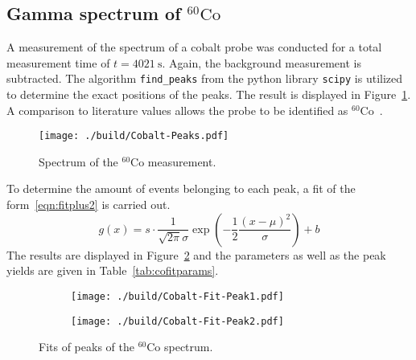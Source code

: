 \subsection{Gamma spectrum of \texorpdfstring{$^{60}\mathrm{Co}$}{cobalt}}
A measurement of the spectrum of a cobalt probe was conducted for a total measurement time of
$t=\SI{4021}{\second}$. Again, the background measurement is subtracted. The algorithm \texttt{find\_peaks}
from the python library \texttt{scipy} \cite{scipy}
is utilized to determine the exact positions of the peaks. The result is displayed in
Figure~\ref{fig:cospectrum}. A comparison to literature values allows the probe to be identified as
$^{60}\text{Co}$~\cite{laraweb}.
\begin{figure}
	\centering
	\begin{adjustbox}{width=1.4\textwidth, center}
		\texttt{[image: ./build/Cobalt-Peaks.pdf]}
	\end{adjustbox}
	\caption{Spectrum of the $^{60}\text{Co}$ measurement.}
	\label{fig:cospectrum}
\end{figure}
\noindent
To determine the amount of events belonging to each peak, a fit of the form~\eqref{eqn:fitplus2} is carried out.
\begin{equation}
	g(x) = s \cdot \frac{1}{\sqrt{2 \pi} \sigma} \exp{\left( -\frac{1}{2} \frac{(x - \mu)^{2}}{\sigma} \right)} + b
	\label{eqn:fitplus2}
\end{equation}
\noindent
The results are displayed in Figure~\ref{fig:cofit} and the parameters as well as the peak yields are given in
Table~\ref{tab:cofitparams}.
\begin{figure}[H]
	\centering
	\begin{adjustbox}{width=1.3\textwidth, center}
		\begin{subfigure}{.5\textwidth}
			\centering
			\texttt{[image: ./build/Cobalt-Fit-Peak1.pdf]}
		\end{subfigure}%
		\begin{subfigure}{.5\textwidth}
			\centering
			\texttt{[image: ./build/Cobalt-Fit-Peak2.pdf]}
		\end{subfigure}
	\end{adjustbox}
	\caption{Fits of peaks of the $^{60}\text{Co}$ spectrum.}
	\label{fig:cofit}
\end{figure}
\noindent
